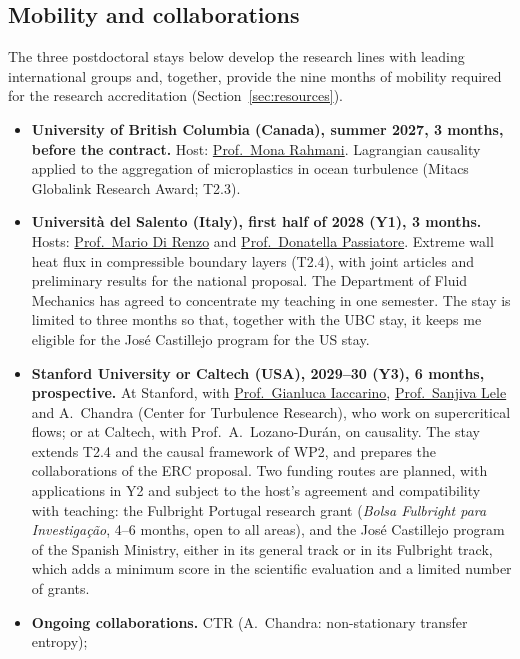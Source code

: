 \documentclass[11pt]{article}
\begin{document}
\subsection{Mobility and collaborations}\label{sec:mobility}
The three postdoctoral stays below develop the research lines with leading international
groups and, together, provide the nine months of mobility required for the research
accreditation (Section~\ref{sec:resources}).
\begin{itemize}
  \item \textbf{University of British Columbia (Canada), summer 2027, 3 months, before the
  contract.} Host: \href{https://chbe.ubc.ca/mona-rahmani/}{Prof.\ Mona Rahmani}. Lagrangian
  causality applied to the aggregation of microplastics in ocean turbulence (Mitacs Globalink
  Research Award; T2.3).
  \item \textbf{Universit\`a del Salento (Italy), first half of 2028 (Y1), 3 months.} Hosts:
  \href{https://www.unisalento.it/scheda-utente/-/people/mario.direnzo}{Prof.\ Mario Di Renzo}
  and \href{https://www.unisalento.it/scheda-utente/-/people/donatella.passiatore}{Prof.\
  Donatella Passiatore}. Extreme wall heat flux in compressible boundary layers (T2.4), with
  joint articles and preliminary results for the national proposal. The Department of Fluid
  Mechanics has agreed to concentrate my teaching in one semester. The stay is limited to
  three months so that, together with the UBC stay, it keeps me eligible for the José
  Castillejo program for the US stay.
  \item \textbf{Stanford University or Caltech (USA), 2029--30 (Y3), 6 months,
  prospective.} At Stanford, with
  \href{https://me.stanford.edu/people/gianluca-iaccarino}{Prof.\ Gianluca Iaccarino},
  \href{https://me.stanford.edu/people/sanjiva-lele}{Prof.\ Sanjiva Lele} and A.\ Chandra
  (Center for Turbulence Research), who work on supercritical flows; or at Caltech, with
  Prof.\ A.\ Lozano-Dur\'an, on causality. The stay extends T2.4 and the causal framework of
  WP2, and prepares the collaborations of the ERC proposal. Two funding routes are planned,
  with applications in Y2 and subject to the host's agreement and compatibility with
  teaching: the Fulbright Portugal research grant (\emph{Bolsa Fulbright para
  Investiga\c{c}\~ao}, 4--6 months, open to all areas), and the José Castillejo program of the
  Spanish Ministry, either in its general track or in its Fulbright track, which adds a minimum
  score in the scientific evaluation and a limited number of grants.
  \item \textbf{Ongoing collaborations.} CTR (A.\ Chandra: non-stationary transfer entropy);

\end{itemize}
\end{document}
